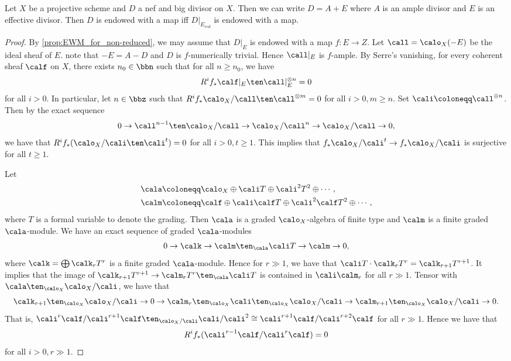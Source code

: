     \begin{proposition}\label{prop:EWM_nef_big_iff_effective_locus_char_p}
        Let \(X\) be a projective scheme and \(D\) a nef and big divisor on \(X\).
        Then we can write \(D = A + E\) where \(A\) is an ample divisor and \(E\) is an effective divisor.
        Then \(D\) is endowed with a map iff \(D|_{E_{red}}\) is endowed with a map.
    \end{proposition}
    \begin{proof}
        By \cref{prop:EWM_for_non-reduced}, we may assume that \(D|_E\) is endowed with a map \(f: E \to Z\).
        Let \(\call = \calo_X(-E)\) be the ideal sheaf of \(E\).
        note that \(-E = A - D\) and \(D\) is \(f\)-numerically trivial.
        Hence \(\call|_E\) is \(f\)-ample.
        By Serre's vanishing, for every coherent sheaf \(\calf\) on \(X\), 
        there exists \(n_0 \in \bbn\) such that for all \(n \geq n_0\), we have 
        \[ R^if_* \calf|_E \ten \call|_{E}^{\otimes n} =  0 \]
        for all \(i > 0\).
        In particular, let \(n \in \bbz\) such that \(R^if_* \calo_X/\call \ten \call^{\otimes m} = 0\) for all \(i > 0,m\geq n\).
        Set \(\cali \coloneqq \call^{\otimes n}\).
        Then by the exact sequence
        \[ 0 \to \call^{n-1} \ten \calo_X/\call \to \calo_X/\call^n \to \calo_X/\call \to 0, \]
        we have that \(R^if_* (\calo_X/\cali \ten \cali^t) = 0\) for all \(i > 0, t\geq 1\).
        This implies that \(f_*\calo_X/\cali^t \to f_*\calo_X/\cali\) is surjective for all \(t \geq 1\).

        Let 
        \begin{align*}
            \cala &\coloneqq \calo_X \oplus \cali T \oplus \cali^2 T^2 \oplus \cdots, \\
            \calm &\coloneqq \calf \oplus \cali \calf T \oplus \cali^2 \calf T^2 \oplus \cdots,
        \end{align*}
        where \(T\) is a formal variable to denote the grading.
        Then \(\cala\) is a graded \(\calo_X\)-algebra of finite type and \(\calm\) is a finite graded \(\cala\)-module.
        We have an exact sequence of graded \(\cala\)-modules
        \[ 0 \to \calk \to \calm \ten_{\cala} \cali T \to \calm \to 0, \]
        where \(\calk = \bigoplus \calk_r T^r\) is a finite graded \(\cala\)-module.
        Hence for \(r \gg 1\), we have that \(\cali T \cdot \calk_r T^r = \calk_{r+1} T^{r+1}\).
        It implies that the image of \(\calk_{r+1} T^{r+1} \to \calm_r T^r \ten_{\cala} \cali T\) is contained in \(\cali \calm_r\) for all \(r \gg 1\).
        Tensor with \(\cala \ten_{\calo_X} \calo_X/\cali\), we have that
        \[ \calk_{r+1} \ten_{\calo_X} \calo_X/\cali \to 0 \to \calm_r \ten_{\calo_X} \cali \ten_{\calo_X} \calo_X/\cali \to \calm_{r+1} \ten_{\calo_X} \calo_X/\cali \to 0. \]
        That is, \(\cali^{r}\calf/\cali^{r+1}\calf \ten_{\calo_X/\cali} \cali/\cali^2 \cong \cali^{r+1}\calf/\cali^{r+2}\calf\) for all \(r \gg 1\).
        Hence we have that
        \[ R^if_* (\cali^{r-1}\calf/\cali^{r}\calf) = 0 \]
        for all \(i > 0, r \gg 1\).


\end{proof}
